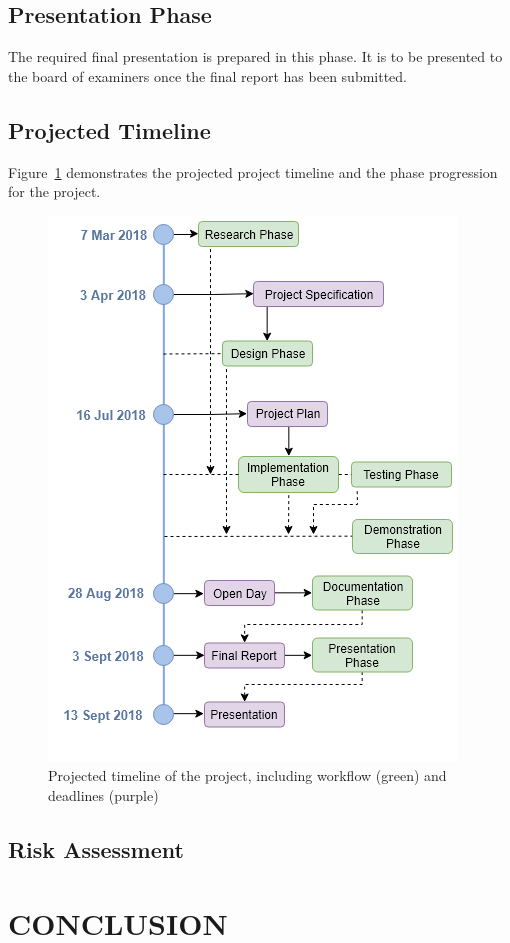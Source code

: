 \documentclass[10pt,twocolumn]{witseiepaper}
\begin{document}
	\subsection{Presentation Phase}
		The required final presentation is prepared in this phase. It is to be presented to the board of examiners once the final report has been submitted.
	
	\subsection{Projected Timeline}
	Figure~\ref{fig:timeline} demonstrates the projected project timeline and the phase progression for the project.
	
	\begin{figure}
		\centering
		\includegraphics[width=1\columnwidth]{media/timeline.png}
		\caption{Projected timeline of the project, including workflow (green) and deadlines (purple)}
		\raggedright
		\label{fig:timeline}
	\end{figure}
	
	
	\subsection{Risk Assessment}

\section{CONCLUSION}

{}

\end{document}
